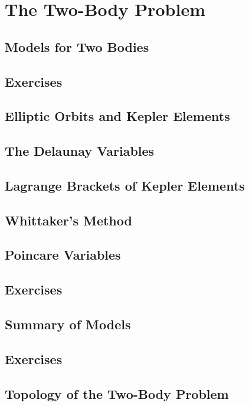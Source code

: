 \chapter{The Two-Body Problem}
\section{Models for Two Bodies}
\section*{Exercises}
\section{Elliptic Orbits and Kepler Elements}
\section{The Delaunay Variables}
\section{Lagrange Brackets of Kepler Elements}
\section{Whittaker's Method}
\section{Poincare Variables}
\section*{Exercises}
\section{Summary of Models}
\section*{Exercises}
\section{Topology of the Two-Body Problem}

